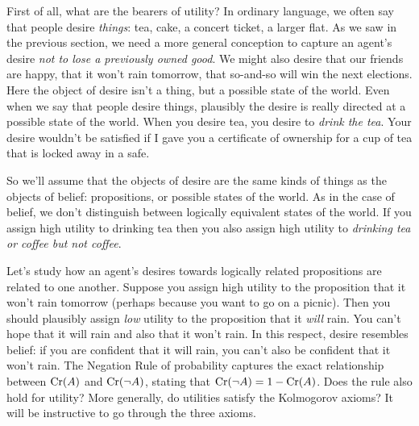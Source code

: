 First of all, what are the bearers of utility? In ordinary language, we often
say that people desire \emph{things}: tea, cake, a concert ticket, a larger
flat. As we saw in the previous section, we need a more general conception to
capture an agent's desire \emph{not to lose a previously owned good}. We might
also desire that our friends are happy, that it won't rain tomorrow, that
so-and-so will win the next elections. Here the object of desire isn't a thing,
but a possible state of the world. Even when we say that people desire things,
plausibly the desire is really directed at a possible state of the world. When
you desire tea, you desire to \emph{drink the tea}. Your desire wouldn't be
satisfied if I gave you a certificate of ownership for a cup of tea that is
locked away in a safe.

So we'll assume that the objects of desire are the same kinds of things as the
objects of belief: propositions, or possible states of the world. As in the case
of belief, we don't distinguish between logically equivalent states of the
world. If you assign high utility to drinking tea then you also assign high
utility to \emph{drinking tea or coffee but not coffee}.


Let's study how an agent's desires towards logically related propositions are
related to one another. Suppose you assign high utility to the proposition that
it won't rain tomorrow (perhaps because you want to go on a picnic). Then you
should plausibly assign \emph{low} utility to the proposition that it
\emph{will} rain. You can't hope that it will rain and also that it won't rain.
In this respect, desire resembles belief: if you are confident that it will
rain, you can't also be confident that it won't rain. The Negation Rule of
probability captures the exact relationship between $\text{Cr}(A)$ and $\text{Cr}(\neg A)$,
stating that $\text{Cr}(\neg A) = 1 - \text{Cr}(A)$. Does the rule also hold for utility?
More generally, do utilities satisfy the Kolmogorov axioms? It will be
instructive to go through the three axioms.

